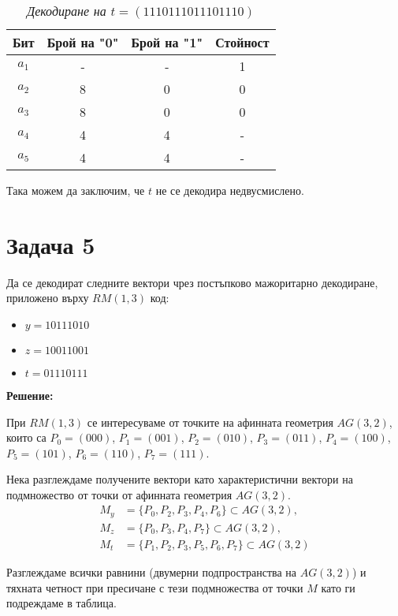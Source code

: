 \documentclass[11pt, oneside]{article}   	%
\begin{document}
\begin{table}[htbp]
    \centering
    \begin{tabular}{cccc}
        \toprule
            \textbf{Бит} & \textbf{Брой на "0"} & \textbf{Брой на "1"} & \textbf{Стойност} \\
        \midrule
            $ a_1 $ & - & - & 1 \\
            $ a_2 $ & 8 & 0 & 0 \\
            $ a_3 $ & 8 & 0 & 0 \\
            $ a_4 $ & 4 & 4 & - \\
            $ a_5 $ & 4 & 4 & - \\
        \bottomrule
    \end{tabular}
    \caption{\textit{Декодиране на $t = (1110 1110 1110 1110)$}}
\end{table}

Така можем да заключим, че $t$ не се декодира недвусмислено.

\section*{Задача 5}
Да се декодират следните вектори чрез постъпково мажоритарно декодиране, приложено върху $RM(1, 3)$ код:
\begin{itemize}
  \item $y = 1011 1010$
  \item $z = 1001 1001$
  \item $t = 0111 0111$
\end{itemize}

\textbf{Решение:}

При $RM(1, 3)$ се интересуваме от точките на афинната геометрия $AG(3, 2)$, които са
$P_0 = (000)$, $P_1 = (001)$, $P_2 = (010)$, $P_3 = (011)$, $P_4 = (100)$, $P_5 = (101)$, $P_6 = (110)$, $P_7 = (111)$.

Нека разглеждаме получените вектори като характеристични вектори на подмножество от точки от афинната геометрия $AG(3, 2)$.
\begin{align*}
M_{y} &= \{P_0,P_2,P_3,P_4,P_6\} \subset AG(3, 2), \\
M_{z} &= \{P_0,P_3,P_4,P_7\} \subset AG(3, 2), \\
M_{t} &= \{P_1,P_2,P_3,P_5,P_6,P_7\} \subset AG(3, 2)
\end{align*}

Разглеждаме всички равнини (двумерни подпространства на $AG(3, 2)$) и тяхната четност при пресичане с тези подмножества от точки $M$ като ги подреждаме в таблица.
\end{document}
